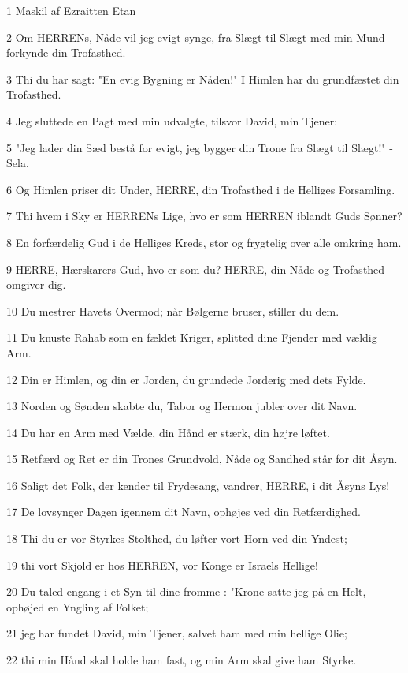 \par 1 Maskil af Ezraitten Etan
\par 2 Om HERRENs, Nåde vil jeg evigt synge, fra Slægt til Slægt med min Mund forkynde din Trofasthed.
\par 3 Thi du har sagt: "En evig Bygning er Nåden!" I Himlen har du grundfæstet din Trofasthed.
\par 4 Jeg sluttede en Pagt med min udvalgte, tilsvor David, min Tjener:
\par 5 "Jeg lader din Sæd bestå for evigt, jeg bygger din Trone fra Slægt til Slægt!" - Sela.
\par 6 Og Himlen priser dit Under, HERRE, din Trofasthed i de Helliges Forsamling.
\par 7 Thi hvem i Sky er HERRENs Lige, hvo er som HERREN iblandt Guds Sønner?
\par 8 En forfærdelig Gud i de Helliges Kreds, stor og frygtelig over alle omkring ham.
\par 9 HERRE, Hærskarers Gud, hvo er som du? HERRE, din Nåde og Trofasthed omgiver dig.
\par 10 Du mestrer Havets Overmod; når Bølgerne bruser, stiller du dem.
\par 11 Du knuste Rahab som en fældet Kriger, splitted dine Fjender med vældig Arm.
\par 12 Din er Himlen, og din er Jorden, du grundede Jorderig med dets Fylde.
\par 13 Norden og Sønden skabte du, Tabor og Hermon jubler over dit Navn.
\par 14 Du har en Arm med Vælde, din Hånd er stærk, din højre løftet.
\par 15 Retfærd og Ret er din Trones Grundvold, Nåde og Sandhed står for dit Åsyn.
\par 16 Saligt det Folk, der kender til Frydesang, vandrer, HERRE, i dit Åsyns Lys!
\par 17 De lovsynger Dagen igennem dit Navn, ophøjes ved din Retfærdighed.
\par 18 Thi du er vor Styrkes Stolthed, du løfter vort Horn ved din Yndest;
\par 19 thi vort Skjold er hos HERREN, vor Konge er Israels Hellige!
\par 20 Du taled engang i et Syn til dine fromme : "Krone satte jeg på en Helt, ophøjed en Yngling af Folket;
\par 21 jeg har fundet David, min Tjener, salvet ham med min hellige Olie;
\par 22 thi min Hånd skal holde ham fast, og min Arm skal give ham Styrke.
